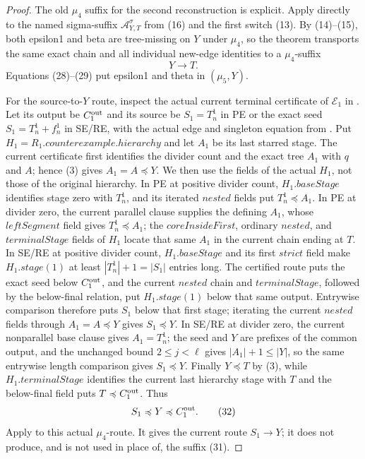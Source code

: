 \begin{proof}
The old $\mu _4$ suffix for the second reconstruction is explicit.
Apply  directly to
the named sigma-suffix $\mathcal A^\sigma_{Y,T}$ from (16) and the first
switch (13).  By (14)--(15), both epsilon1 and beta are tree-missing on
$Y$ under $\mu _4$, so the theorem transports the same exact chain and
all individual new-edge identities to a $\mu _4$-suffix
\[
                              Y\longrightarrow T.             \tag{31}
\]
Equations (28)--(29) put epsilon1 and theta in
$(\mu _5,Y)$.

For the source-to-$Y$ route, inspect the actual current terminal
certificate of $\mathcal E_1$ in
.  Let its output be $C_1^{\rm out}$ and its
source be $S_1=T_n^1$ in PE or the exact seed
$S_1=T_n^1+f_n^1$ in SE/RE, with the actual edge and singleton equation
from .  Put
$H_1=R_1.\mathit{counterexample.hierarchy}$ and let $A_1$ be its last
starred stage.  The current  certificate first
identifies the divider count and the exact tree $A_1$ with $q$ and $A$;
hence (3) gives
$A_1=A\preccurlyeq Y$.  We then use the fields of the actual
 $H_1$, not those of the original hierarchy.
In PE at positive divider count, $H_1.\mathit{baseStage}$ identifies stage
zero with $T_n^1$, and its iterated \(\mathit{nested}\) fields put
$T_n^1\preccurlyeq A_1$.  In PE at divider zero, the current
 parallel clause supplies the
 defining $A_1$, whose
\(\mathit{leftSegment}\) field gives $T_n^1\preccurlyeq A_1$; the
\(\mathit{coreInsideFirst}\), ordinary \(\mathit{nested}\), and
\(\mathit{terminalStage}\) fields of $H_1$ locate that same $A_1$ in the
current chain ending at $T$.  In SE/RE at positive divider count,
$H_1.\mathit{baseStage}$ and its first \(\mathit{strict}\) field make
$H_1.\mathit{stage}(1)$ at least $|T_n^1|+1=|S_1|$ entries long.  The
certified route puts the exact seed below $C_1^{\rm out}$, and the current
\(\mathit{nested}\) chain and \(\mathit{terminalStage}\), followed by the
below-final relation, put $H_1.\mathit{stage}(1)$ below that same output.
Entrywise comparison therefore puts $S_1$ below that first stage; iterating
the current \(\mathit{nested}\) fields through
$A_1=A\preccurlyeq Y$ gives $S_1\preccurlyeq Y$.  In SE/RE at divider
zero, the current nonparallel
base clause gives $A_1=T_n^1$; the seed and $Y$ are prefixes of the common
output, and the unchanged bound $2\le j<\ell$ gives
$|A_1|+1\le |Y|$, so the same entrywise length comparison gives
$S_1\preccurlyeq Y$.  Finally $Y\preccurlyeq T$ by (3), while
$H_1.\mathit{terminalStage}$ identifies the current last hierarchy stage
with $T$ and the below-final field puts $T\preccurlyeq C_1^{\rm out}$.
Thus
\[
                     S_1\preccurlyeq Y\preccurlyeq C_1^{\rm out}. \tag{32}
\]
Apply  to this actual
$\mu _4$-route.  It gives the current route
$S_1\longrightarrow Y$; it does not produce, and is not used in place
of, the suffix (31).


\end{proof}
